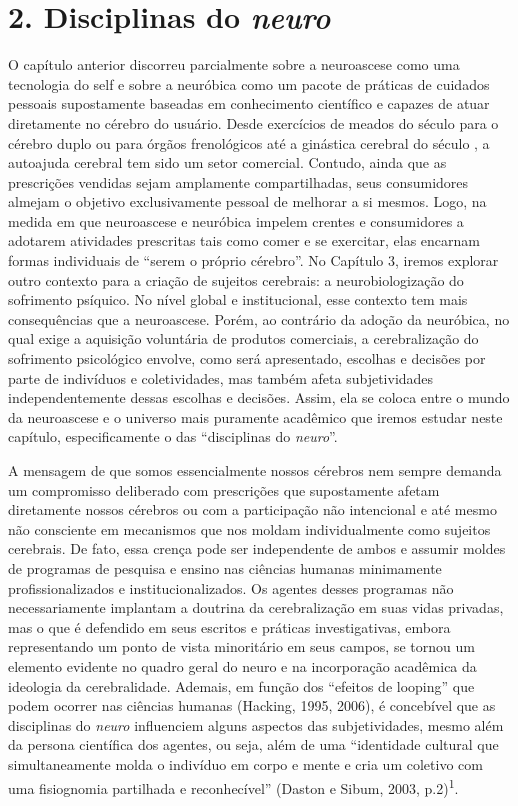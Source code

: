 \part{2. Disciplinas do \emph{neuro}}

O capítulo anterior discorreu parcialmente sobre a neuroascese como uma
tecnologia do self e sobre a neuróbica como um pacote de práticas de
cuidados pessoais supostamente baseadas em conhecimento científico e
capazes de atuar diretamente no cérebro do usuário. Desde exercícios de
meados do século  para o cérebro duplo ou para órgãos frenológicos
até a ginástica cerebral do século , a autoajuda cerebral tem sido um
setor comercial. Contudo, ainda que as prescrições vendidas sejam
amplamente compartilhadas, seus consumidores almejam o objetivo
exclusivamente pessoal de melhorar a si mesmos. Logo, na medida em que
neuroascese e neuróbica impelem crentes e consumidores a adotarem
atividades prescritas tais como comer e se exercitar, elas encarnam
formas individuais de ``serem o próprio cérebro''. No Capítulo 3, iremos
explorar outro contexto para a criação de sujeitos cerebrais: a
neurobiologização do sofrimento psíquico. No nível global e
institucional, esse contexto tem mais consequências que a neuroascese.
Porém, ao contrário da adoção da neuróbica, no qual exige a aquisição
voluntária de produtos comerciais, a cerebralização do sofrimento
psicológico envolve, como será apresentado, escolhas e decisões por
parte de indivíduos e coletividades, mas também afeta subjetividades
independentemente dessas escolhas e decisões. Assim, ela se coloca entre
o mundo da neuroascese e o universo mais puramente acadêmico que iremos
estudar neste capítulo, especificamente o das ``disciplinas do
\emph{neuro}''.

A mensagem de que somos essencialmente nossos cérebros nem sempre
demanda um compromisso deliberado com prescrições que supostamente
afetam diretamente nossos cérebros ou com a participação não intencional
e até mesmo não consciente em mecanismos que nos moldam individualmente
como sujeitos cerebrais. De fato, essa crença pode ser independente de
ambos e assumir moldes de programas de pesquisa e ensino nas ciências
humanas minimamente profissionalizados e institucionalizados. Os agentes
desses programas não necessariamente implantam a doutrina da
cerebralização em suas vidas privadas, mas o que é defendido em seus
escritos e práticas investigativas, embora representando um ponto de
vista minoritário em seus campos, se tornou um elemento evidente no
quadro geral do neuro e na incorporação acadêmica da ideologia da
cerebralidade. Ademais, em função dos ``efeitos de looping'' que podem
ocorrer nas ciências humanas (Hacking, 1995, 2006), é concebível que as
disciplinas do \emph{neuro} influenciem alguns aspectos das
subjetividades, mesmo além da persona científica dos agentes, ou seja,
além de uma ``identidade cultural que simultaneamente molda o indivíduo
em corpo e mente e cria um coletivo com uma fisiognomia partilhada e
reconhecível'' (Daston e Sibum, 2003, p.2)\textsuperscript{1}.

